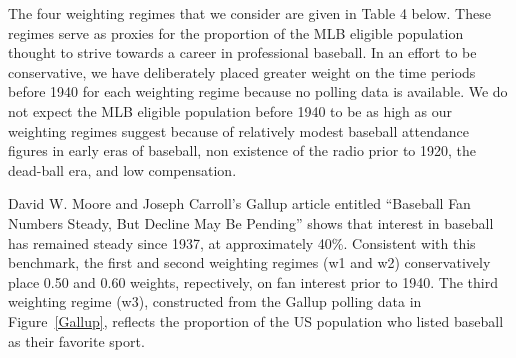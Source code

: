 \documentclass[11pt]{article}\usepackage[]{graphicx}\usepackage[]{color}
\begin{document}
The four weighting regimes that we consider 
are given in Table 4 below.  
These regimes serve as proxies for the proportion of the 
MLB eligible population thought to strive towards a career in professional 
baseball.  
In an effort to be conservative, we have deliberately placed greater weight 
on the time periods before 1940 for each weighting regime because no polling 
data is available.
We do not expect the MLB eligible population before 1940 to be as 
high as our weighting regimes suggest because of 
relatively modest baseball attendance figures in early eras of baseball,  
non existence of the radio prior to 1920, 
the dead-ball era,
and low compensation.  




David W. Moore and Joseph Carroll's Gallup article entitled 
``Baseball Fan Numbers Steady, But Decline May Be Pending'' shows that 
interest in baseball has remained steady since 1937, at approximately
40\%.  %
Consistent with this benchmark, the first and second weighting regimes 
(w1 and w2) conservatively place 0.50 and 0.60 weights, repectively, 
on fan interest prior to 1940.  %
The third weighting regime (w3), constructed from the Gallup polling data in 
Figure~\ref{Gallup}, reflects the proportion of the US population who 
listed baseball as their favorite sport.  
\end{document}
